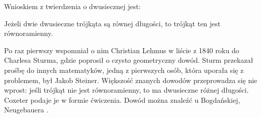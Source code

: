 %

Wnioskiem z twierdzenia o dwusiecznej jest:

\begin{theorem}
    \label{theorem_steiner_lehmus}
	Jeżeli dwie dwusieczne trójkąta są równej długości, to trójkąt ten jest równoramienny.
\end{theorem}

Po raz pierwszy wspomniał o nim Christian Lehmus w liście z 1840 roku do Charlesa Sturma, gdzie poprosił o czysto geometryczny dowód.
%
%
Sturm przekazał prośbę do innych matematyków, jedną z pierwszych osób, która uporała się z problemem, był Jakob Steiner.
%
Większość znanych dowodów przeprowadza się nie wprost: jeśli trójkąt nie jest równoramienny, to ma dwusieczne różnej długości.
Coxeter \cite[s. 9]{coxeter_1991} podaje je w formie ćwiczenia.
Dowód można znaleźć u Bogdańskiej, Neugebauera \cite[s. 74]{neugebauer_2018}.

%